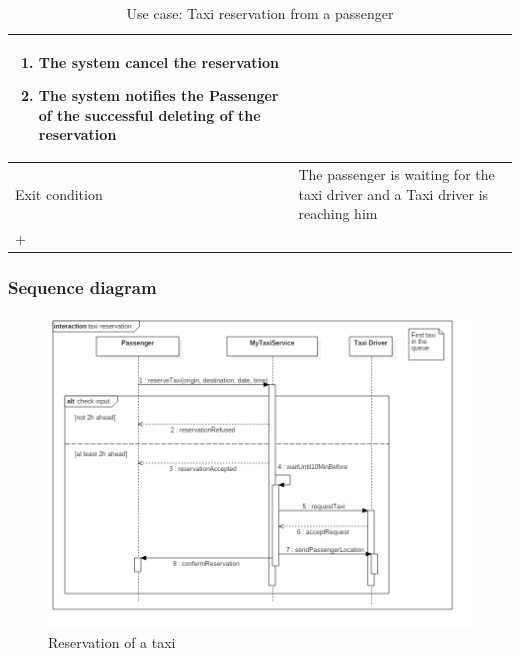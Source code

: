 \begin{center}
\begin{longtable}{| p{} | p{} |}
\begin{enumerate}
		\item The system cancel the reservation
		\item The system notifies the Passenger of the successful deleting of the reservation
		\end{enumerate} \\ \hline
Exit condition & The passenger is waiting for the taxi driver and a Taxi driver is reaching him
		\\ \hline
		\caption{Use case: Taxi reservation from a passenger}+
		\label{reserveTaxiUC}
	\end{longtable}
\end{center}

\subsubsection{Sequence diagram}
\begin{figure}[H]
\centering
\includegraphics[scale=0.5]{Images/sequence_taxi_reservation}
\caption{Reservation of a taxi}
\label{reserve_taxi_SD}
\end{figure}



